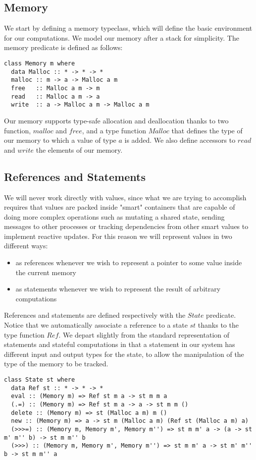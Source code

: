 \subsection{Memory}
We start by defining a memory typeclass, which will define the basic environment for our computations. We model our memory after a stack for simplicity. The memory predicate is defined as follows:

\begin{lstlisting}
class Memory m where
  data Malloc :: * -> * -> *
  malloc :: m -> a -> Malloc a m
  free   :: Malloc a m -> m
  read   :: Malloc a m -> a
  write  :: a -> Malloc a m -> Malloc a m
\end{lstlisting}

Our memory supports type-safe allocation and deallocation 
thanks to two function, $malloc$ and $free$, and a type 
function $Malloc$ that defines the type of our memory 
to which a value of type $a$ is added. We also define accessors to $read$ and $write$ the elements of our memory.

\subsection{References and Statements}
We will never work directly with values, since what we are trying to accomplish requires that values are packed inside "smart" containers that are capable of doing more complex operations such as mutating a shared state, sending messages to other processes or tracking dependencies from other smart values to implement reactive updates. For this reason we will represent values in two different ways:
\begin{itemize}
\item as references whenever we wish to represent a pointer to some value inside the current memory
\item as statements whenever we wish to represent the result of arbitrary computations
\end{itemize}

References and statements are defined respectively with the $State$ predicate. Notice that we automatically associate
a reference to a state $st$ thanks to the type function 
$Ref$. We depart slightly from the standard representation 
of statements and stateful computations in that a statement in our system has different input and output types for the 
state, to allow the manipulation of the type of the memory
to be tracked.

\begin{lstlisting}
class State st where
  data Ref st :: * -> * -> *
  eval :: (Memory m) => Ref st m a -> st m m a
  (.=) :: (Memory m) => Ref st m a -> a -> st m m ()
  delete :: (Memory m) => st (Malloc a m) m ()
  new :: (Memory m) => a -> st m (Malloc a m) (Ref st (Malloc a m) a)
  (>>>=) :: (Memory m, Memory m', Memory m'') => st m m' a -> (a -> st m' m'' b) -> st m m'' b
  (>>>) :: (Memory m, Memory m', Memory m'') => st m m' a -> st m' m'' b -> st m m'' a
\end{lstlisting}

